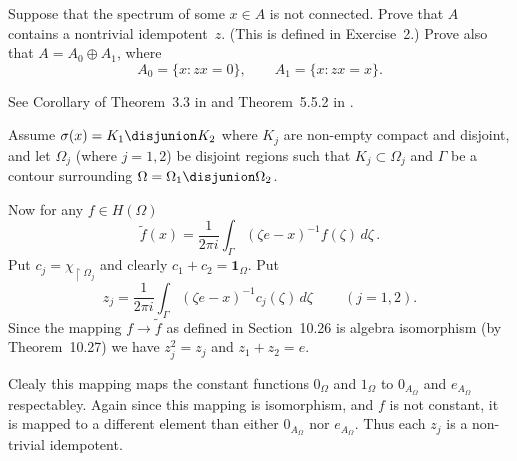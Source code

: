 \begin{enumerate}
\begin{excopy}
Suppose that the spectrum of some \(x \in A\) is not connected.
Prove that $A$ contains a nontrivial idempotent~$z$.
(This is defined in Exercise~2.)
Prove also that \(A = A_0 \oplus A_1\), where
\begin{equation*}
A_0 = \{x: zx=0\}, \qquad A_1 = \{x: zx=x\}.
\end{equation*}
\end{excopy}

See Corollary of Theorem~3.3 in \cite{wermer2013banach}
and Theorem~5.5.2 in \cite{hille1974functional}.

Assume \(\sigma(x) = K_1 \disjunion K_2\) where \(K_j\) are non-empty compact and disjoint, and let \(\Omega_j\) (where \(j=1,2\)) be disjoint regions
such that \(K_j\subset \Omega_j\)
and \(\Gamma\) be a contour surrounding
 \(\Omega = \Omega_1 \disjunion \Omega_2\).
\iffalse
such that
\begin{equation*}
\Ind_{\Gamma_j}(z) = \frac{1}{2\pi i} \int_{\Gamma_j} \frac{dw}{w - z} =
  \left\{
    \begin{array}{ll}
    1 & \quad z \in K_j \\
    0 & \quad z \notin \Omega_j
    \end{array}
  \right.    
\end{equation*}
\fi

Now for any \(f\in H(\Omega)\)
\begin{equation*}
\widetilde{f}(x) = \frac{1}{2\pi i}
  \int_{\Gamma}
    (\zeta e - x)^{-1}f(\zeta)\,d\zeta\,.
\end{equation*}
Put \(c_j = \chi_{\restriction \Omega_j}\)
and clearly \(c_1 + c_2 = \bm{1}_\Omega\).
Put
\begin{equation*}
z_j = \frac{1}{2\pi i} \int_{\Gamma} (\zeta e - x)^{-1} c_j(\zeta)\,d\zeta\
\qquad (j=1,2).
\end{equation*}
Since the mapping \(f\to\widetilde{f}\) as defined in Section~10.26
is algebra isomorphism (by Theorem~10.27) we have \(z_j^2 = z_j\)
and \(z_1 + z_2 = e\). %

Clealy this mapping maps the constant functions \(0_\Omega\) and \(1_\Omega\)
to \(0_{A_\Omega}\) and \(e_{A_\Omega}\) respectabley.
Again since this mapping is isomorphism, and $f$ is not constant,
it is mapped to a different element than either \(0_{A_\Omega}\) nor \(e_{A_\Omega}\).
Thus each \(z_j\) is a non-trivial idempotent.


\end{enumerate}
